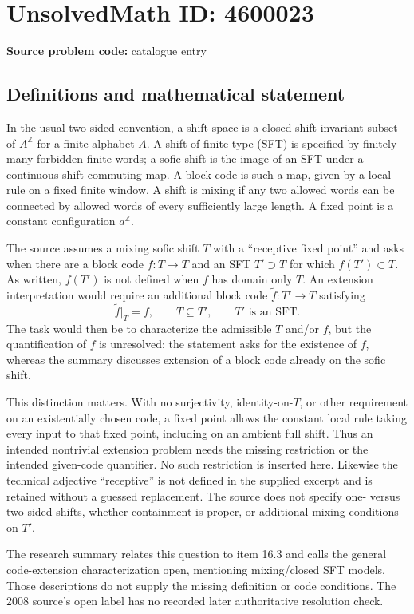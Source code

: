 \documentclass[11pt]{article}
\begin{document}
\section*{UnsolvedMath ID: 4600023}
\textbf{Source problem code:} catalogue entry
\subsection{Definitions and mathematical statement}
In the usual two-sided convention, a shift space is a closed shift-invariant subset of \(A^{\mathbb Z}\) for a finite alphabet \(A\). A shift of finite type (SFT) is specified by finitely many forbidden finite words; a sofic shift is the image of an SFT under a continuous shift-commuting map. A block code is such a map, given by a local rule on a fixed finite window. A shift is mixing if any two allowed words can be connected by allowed words of every sufficiently large length. A fixed point is a constant configuration \(a^{\mathbb Z}\).

The source assumes a mixing sofic shift \(T\) with a ``receptive fixed point'' and asks when there are a block code \(f:T\to T\) and an SFT \(T'\supset T\) for which \(f(T')\subset T\). As written, \(f(T')\) is not defined when \(f\) has domain only \(T\). An extension interpretation would require an additional block code \(\widetilde f:T'\to T\) satisfying
\[
 \widetilde f|_T=f,\qquad T\subseteq T',\qquad T'\text{ is an SFT}.
\]
The task would then be to characterize the admissible \(T\) and/or \(f\), but the quantification of \(f\) is unresolved: the statement asks for the existence of \(f\), whereas the summary discusses extension of a block code already on the sofic shift.

This distinction matters. With no surjectivity, identity-on-\(T\), or other requirement on an existentially chosen code, a fixed point allows the constant local rule taking every input to that fixed point, including on an ambient full shift. Thus an intended nontrivial extension problem needs the missing restriction or the intended given-code quantifier. No such restriction is inserted here. Likewise the technical adjective ``receptive'' is not defined in the supplied excerpt and is retained without a guessed replacement. The source does not specify one- versus two-sided shifts, whether containment is proper, or additional mixing conditions on \(T'\).

The research summary relates this question to item 16.3 and calls the general code-extension characterization open, mentioning mixing/closed SFT models. Those descriptions do not supply the missing definition or code conditions. The 2008 source's open label has no recorded later authoritative resolution check.
\end{document}

